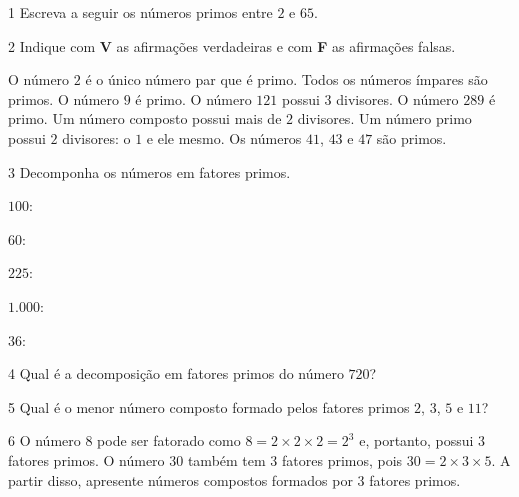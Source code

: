 \num{1} Escreva a seguir os números primos entre $2$ e $65$.


\num{2} Indique com \textbf{V} as afirmações verdadeiras e com \textbf{F} as afirmações falsas.

\begin{boxlist}
 O número $2$ é o único número par que é primo.
 Todos os números ímpares são primos.
 O número $9$ é primo.
 O número $121$ possui $3$ divisores.
 O número $289$ é primo.
 Um número composto possui mais de $2$ divisores.
 Um número primo possui $2$ divisores: o $1$ e ele mesmo.
 Os números $41$, $43$ e $47$ são primos.
\end{boxlist}

\num{3} Decomponha os números em fatores primos.

\begin{escolha}
\item  $100$: 
\item  $60$: 
\item  $225$: 
\item  $1.000$: 
\item  $36$: 
\end{escolha}

\num{4} Qual é a decomposição em fatores primos do número $720$?


\num{5} Qual é o menor número composto formado pelos fatores primos $2$, $3$, $5$ e $11$?


\num{6}  O número $8$ pode ser fatorado como $8 = 2 \times 2 \times 2 = 2^3$ e, portanto,
possui $3$ fatores primos. O número $30$ também tem $3$ fatores primos, pois
$30 = 2 \times 3 \times 5$. A partir disso, apresente 
números compostos formados por $3$ fatores primos.


